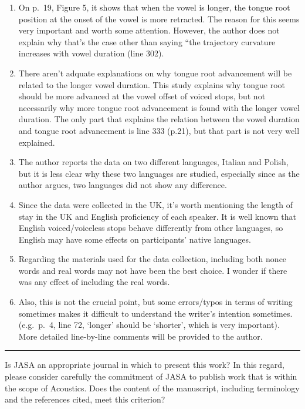 \documentclass[]{article}
\begin{document}
\begin{enumerate}
\def\labelenumi{\arabic{enumi}.}
\setcounter{enumi}{1}
\item
  On p.~19, Figure 5, it shows that when the vowel is longer, the tongue
  root position at the onset of the vowel is more retracted. The reason
  for this seems very important and worth some attention. However, the
  author does not explain why that's the case other than saying ``the
  trajectory curvature increases with vowel duration (line 302).
\item
  There aren't adquate explanations on why tongue root advancement will
  be related to the longer vowel duration. This study explains why
  tongue root should be more advanced at the vowel offset of voiced
  stops, but not necessarily why more tongue root advancement is found
  with the longer vowel duration. The only part that explains the
  relation between the vowel duration and tongue root advancement is
  line 333 (p.21), but that part is not very well explained.
\item
  The author reports the data on two different languages, Italian and
  Polish, but it is less clear why these two languages are studied,
  especially since as the author argues, two languages did not show any
  difference.
\item
  Since the data were collected in the UK, it's worth mentioning the
  length of stay in the UK and English proficiency of each speaker. It
  is well known that English voiced/voiceless stops behave differently
  from other languages, so English may have some effects on
  participants' native languages.
\item
  Regarding the materials used for the data collection, including both
  nonce words and real words may not have been the best choice. I wonder
  if there was any effect of including the real words.
\item
  Also, this is not the crucial point, but some errors/typos in terms of
  writing sometimes makes it difficult to understand the writer's
  intention sometimes. (e.g.~p.~4, line 72, `longer' should be
  `shorter', which is very important). More detailed line-by-line
  comments will be provided to the author.
\end{enumerate}

\begin{center}\rule{0.5\linewidth}{\linethickness}\end{center}

Is JASA an appropriate journal in which to present this work? In this
regard, please consider carefully the commitment of JASA to publish work
that is within the scope of Acoustics. Does the content of the
manuscript, including terminology and the references cited, meet this
criterion?
\end{document}
